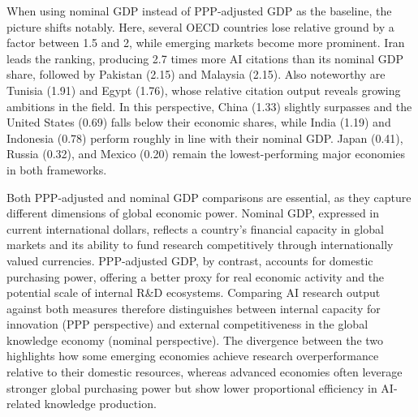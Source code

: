 \documentclass{article}
\begin{document}
When using nominal GDP instead of PPP-adjusted GDP as the baseline, the picture shifts notably. Here, several OECD countries lose relative ground by a factor between 1.5 and 2, while emerging markets become more prominent. Iran leads the ranking, producing 2.7 times more AI citations than its nominal GDP share, followed by Pakistan (2.15) and Malaysia (2.15). Also noteworthy are Tunisia (1.91) and Egypt (1.76), whose relative citation output reveals growing ambitions in the field. In this perspective, China (1.33) slightly surpasses and the United States (0.69) falls below their economic shares, while India (1.19) and Indonesia (0.78) perform roughly in line with their nominal GDP. Japan (0.41), Russia (0.32), and Mexico (0.20) remain the lowest-performing major economies in both frameworks.

Both PPP-adjusted and nominal GDP comparisons are essential, as they capture different dimensions of global economic power.
Nominal GDP, expressed in current international dollars, reflects a country’s financial capacity in global markets and its ability to fund research competitively through internationally valued currencies. PPP-adjusted GDP, by contrast, accounts for domestic purchasing power, offering a better proxy for real economic activity and the potential scale of internal R\&D ecosystems.
Comparing AI research output against both measures therefore distinguishes between internal capacity for innovation (PPP perspective) and external competitiveness in the global knowledge economy (nominal perspective). The divergence between the two highlights how some emerging economies achieve research overperformance relative to their domestic resources, whereas advanced economies often leverage stronger global purchasing power but show lower proportional efficiency in AI-related knowledge production.
\end{document}
